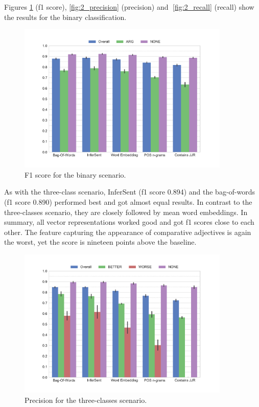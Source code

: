 Figures \ref{fig:2_f1} (f1 score), \ref{fig:2_precision} (precision) and \ref{fig:2_recall} (recall) show the results for the binary classification.
\begin{figure}[h]
      \caption{F1 score for the binary scenario.} 
    \label{fig:2_f1}
 \centering
	\includegraphics[width=0.9\textwidth]{images/experiments/f1-True}

\end{figure}
As with the three-class scenario, InferSent (f1 score 0.894) and the bag-of-words (f1 score 0.890) performed best and got almost equal results. In contrast to the three-classes scenario, they are closely followed by mean word embeddings. In summary, all vector representations worked good and got f1 scores close to each other. The feature capturing the appearance of comparative adjectives is again the worst, yet the score is nineteen points above the baseline.



\begin{figure}[tb]
   \caption{Precision for the three-classes scenario.} 
    \label{fig:3_precision}
 \centering
	\includegraphics[width=0.9\textwidth]{images/experiments/precision-False}
\end{figure}


